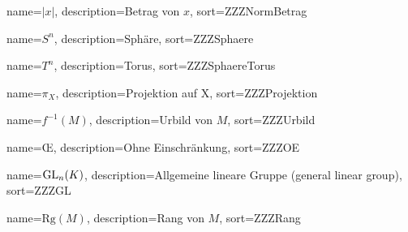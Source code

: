 {
  name={\ensuremath{| x |}},
  description={Betrag von $x$},
  sort=ZZZNormBetrag
}

{
  name={\ensuremath{S^n}},
  description={Sphäre},
  sort=ZZZSphaere
}

{
  name={\ensuremath{T^n}},
  description={Torus},
  sort=ZZZSphaereTorus
}

{
  name={\ensuremath{\pi_X}},
  description={Projektion auf X},
  sort=ZZZProjektion
}

{
  name={\ensuremath{f^{-1}(M)}},
  description={Urbild von $M$},
  sort=ZZZUrbild
}

{
  name={$\text{\OE}$},
  description={Ohne Einschränkung},
  sort=ZZZOE
}

{
  name={$\mathrm{GL}_n(K)$},
  description={Allgemeine lineare Gruppe (general linear group)},
  sort=ZZZGL
}


{
  name={$\text{Rg}(M)$},
  description={Rang von $M$},
  sort=ZZZRang
}

\renewcommand*{\glossaryname}{\glossarName}

\glsaddall
\printglossaries

